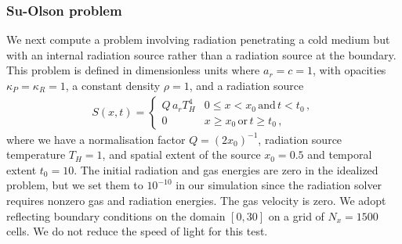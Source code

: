 \documentclass[fleqn,usenatbib]{mnras}
\begin{document}
\subsubsection{Su-Olson problem}
We next compute a problem involving radiation penetrating a cold medium but with an internal radiation source rather than a radiation source at the boundary. This problem is defined in dimensionless units where $a_r = c = 1$, with opacities $\kappa_P = \kappa_R = 1$, a constant density $\rho = 1$, and a radiation source
\begin{align}
S(x,t) =
\begin{cases}
    Q \, a_r T_H^4 & 0 \leq x < x_0 \, \text{and} \, t < t_0 \, , \\
    0 & x \geq x_0 \, \text{or} \, t \geq t_0 \, ,
\end{cases}
\end{align}
where we have a normalisation factor $Q = (2 x_0)^{-1}$, radiation source temperature $T_H = 1$, and spatial extent of the source $x_0 = 0.5$ and temporal extent $t_0 = 10$. The initial radiation and gas energies are zero in the idealized problem, but we set them to $10^{-10}$ in our simulation since the radiation solver requires nonzero gas and radiation energies. The gas velocity is zero. We adopt reflecting boundary conditions on the domain $[0, 30]$ on a grid of $N_x = 1500$ cells. We do not reduce the speed of light for this test.
\end{document}
